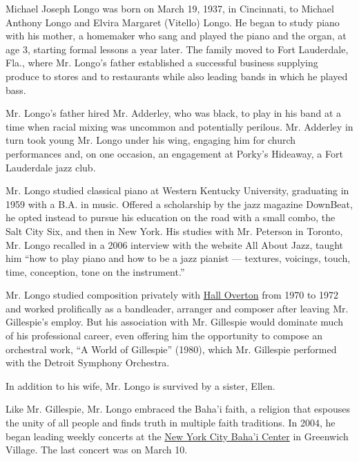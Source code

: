 Michael Joseph Longo was born on March 19, 1937, in Cincinnati, to
Michael Anthony Longo and Elvira Margaret (Vitello) Longo. He began to
study piano with his mother, a homemaker who sang and played the piano
and the organ, at age 3, starting formal lessons a year later. The
family moved to Fort Lauderdale, Fla., where Mr. Longo's father
established a successful business supplying produce to stores and to
restaurants while also leading bands in which he played bass.

Mr. Longo's father hired Mr. Adderley, who was black, to play in his
band at a time when racial mixing was uncommon and potentially perilous.
Mr. Adderley in turn took young Mr. Longo under his wing, engaging him
for church performances and, on one occasion, an engagement at Porky's
Hideaway, a Fort Lauderdale jazz club.

Mr. Longo studied classical piano at Western Kentucky University,
graduating in 1959 with a B.A. in music. Offered a scholarship by the
jazz magazine DownBeat, he opted instead to pursue his education on the
road with a small combo, the Salt City Six, and then in New York. His
studies with Mr. Peterson in Toronto, Mr. Longo recalled in a 2006
interview with the website All About Jazz, taught him ``how to play
piano and how to be a jazz pianist --- textures, voicings, touch, time,
conception, tone on the instrument.''

Mr. Longo studied composition privately with
\href{https://www.nytimes3xbfgragh.onion/1972/11/26/archives/hall-overton-of-juilliard-dead-symphonic-and-jazz-composer.html}{Hall
Overton} from 1970 to 1972 and worked prolifically as a bandleader,
arranger and composer after leaving Mr. Gillespie's employ. But his
association with Mr. Gillespie would dominate much of his professional
career, even offering him the opportunity to compose an orchestral work,
``A World of Gillespie'' (1980), which Mr. Gillespie performed with the
Detroit Symphony Orchestra.

In addition to his wife, Mr. Longo is survived by a sister, Ellen.

Like Mr. Gillespie, Mr. Longo embraced the Baha'i faith, a religion that
espouses the unity of all people and finds truth in multiple faith
traditions. In 2004, he began leading weekly concerts at the
\href{http://bahainyc.org/}{New York City Baha'i Center} in Greenwich
Village. The last concert was on March 10.

\href{https://www.nytimes3xbfgragh.onion/interactive/2020/obituaries/people-died-coronavirus-obituaries.html?action=click\&pgtype=Article\&state=default\&region=BELOW_MAIN_CONTENT\&context=covid_obits_promo}{}


